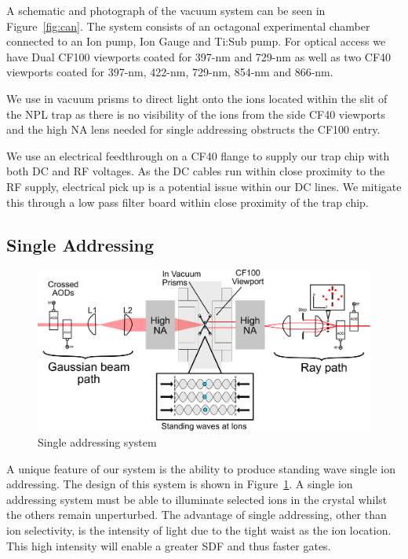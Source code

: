 \documentclass[12pt]{iopart}
\begin{document}
A schematic and photograph of the vacuum system can be seen in
Figure~\ref{fig:can}. The system consists of an octagonal experimental
chamber connected to an Ion pump, Ion Gauge and Ti:Sub pump. For
optical access we have Dual CF100 viewports coated for 397-nm and
729-nm as well as two CF40 viewports coated for 397-nm, 422-nm,
729-nm, 854-nm and 866-nm.

We use in vacuum prisms to direct light onto the ions located within
the slit of the NPL trap as there is no visibility of the ions from
the side CF40 viewports and the high NA lens needed for single
addressing obstructs the CF100 entry.

We use an electrical feedthrough on a CF40 flange to supply our trap
chip with both DC and RF voltages. As the DC cables run within close
proximity to the RF supply, electrical pick up is a potential issue
within our DC lines. We mitigate this through a low pass filter board
within close proximity of the trap chip.


\subsection{Single Addressing}

\begin{figure}
  \begin{center}
   \noindent\includegraphics[width=\linewidth]{figures/vac_can_AOD_small.pdf}
  \end{center}
  \caption{Single addressing system}
  \label{fig:AOD}
\end{figure}

A unique feature of our system is the ability to produce standing wave
single ion addressing. The design of this system is shown in
Figure~\ref{fig:AOD}.  A single ion addressing system must be able to
illuminate selected ions in the crystal whilst the others remain
unperturbed. The advantage of single addressing, other than ion
selectivity, is the intensity of light due to the tight waist as the
ion location. This high intensity will enable a greater SDF and thus
faster gates.
\end{document}
